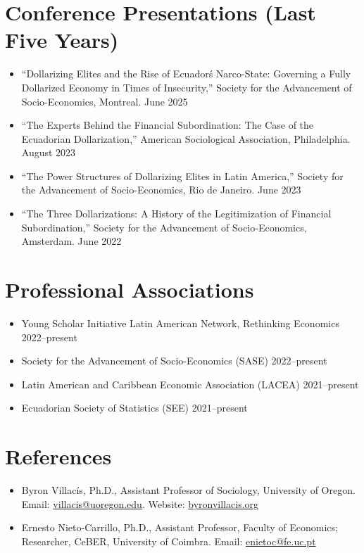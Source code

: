 ﻿\documentclass[11pt]{article}
\begin{document}
\section*{Conference Presentations (Last Five Years)}
\begin{itemize}
\item ``Dollarizing Elites and the Rise of Ecuador\'s Narco-State: Governing a Fully Dollarized Economy in Times of Insecurity,'' Society for the Advancement of Socio-Economics, Montreal. \hfill June 2025
\item ``The Experts Behind the Financial Subordination: The Case of the Ecuadorian Dollarization,'' American Sociological Association, Philadelphia. \hfill August 2023
\item ``The Power Structures of Dollarizing Elites in Latin America,'' Society for the Advancement of Socio-Economics, Rio de Janeiro. \hfill June 2023
\item ``The Three Dollarizations: A History of the Legitimization of Financial Subordination,'' Society for the Advancement of Socio-Economics, Amsterdam. \hfill June 2022
\end{itemize}

\section*{Professional Associations}
\begin{itemize}
\item Young Scholar Initiative Latin American Network, Rethinking Economics \hfill 2022--present
\item Society for the Advancement of Socio-Economics (SASE) \hfill 2022--present
\item Latin American and Caribbean Economic Association (LACEA) \hfill 2021--present
\item Ecuadorian Society of Statistics (SEE) \hfill 2021--present
\end{itemize}

\section*{References}
\begin{itemize}
\item Byron Villac\'is, Ph.D., Assistant Professor of Sociology, University of Oregon. Email: \href{mailto:villacis@uoregon.edu}{villacis@uoregon.edu}. Website: \href{https://byronvillacis.org}{byronvillacis.org}
\item Ernesto Nieto-Carrillo, Ph.D., Assistant Professor, Faculty of Economics; Researcher, CeBER, University of Coimbra. Email: \href{mailto:enietoc@fe.uc.pt}{enietoc@fe.uc.pt}
\end{itemize}
\end{document}
